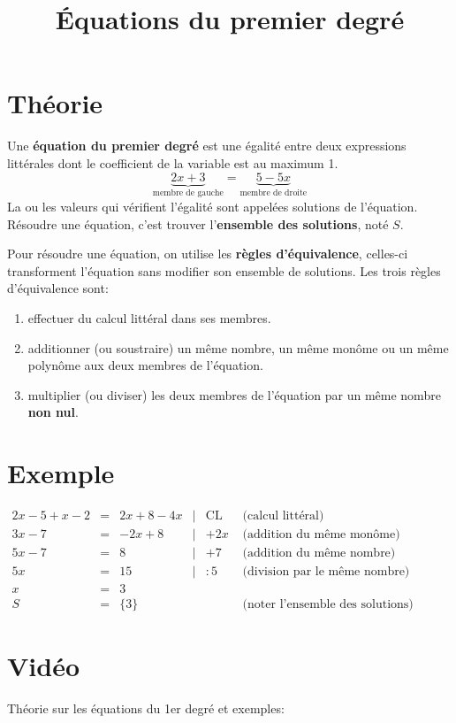 \documentclass[a4paper,11pt]{article}
\begin{document}
\title{Équations du premier degré}
\date{}
\maketitle

\section{Théorie}
Une \textbf{équation du premier degré} est une égalité entre deux expressions littérales dont le coefficient de la variable est au maximum 1.
$$\underbrace{2x + 3}_{\text{membre de gauche}} = \underbrace{5 - 5x}_{\text{membre de droite}}$$
La ou les valeurs qui vérifient l'égalité sont appelées solutions de l'équation. Résoudre une équation, c'est trouver l'\textbf{ensemble des solutions}, noté $S$.

Pour résoudre une équation, on utilise les \textbf{règles d'équivalence}, celles-ci transforment l'équation sans modifier son ensemble de solutions. Les trois règles d'équivalence sont:
\begin{enumerate}[label*=\arabic*.]
\item effectuer du calcul littéral dans ses membres.
\item additionner (ou soustraire) un même nombre, un même monôme ou un même polynôme aux deux membres de l'équation.
\item multiplier (ou diviser) les deux membres de l'équation par un même nombre \textbf{non nul}.
\end{enumerate}

\section{Exemple}
$\begin{array}{rclrll}
2x-5+x-2 &=&2x+8-4x &|& \text{CL} & \text{ (calcul littéral)} \\
3x-7 &=&-2x+8 &|& +2x & \text{ (addition du même monôme)} \\
5x-7 &=& 8 &|& +7 &  \text{ (addition du même nombre)}\\
5x &=& 15 &|& :5 & \text{ (division par le même nombre)}\\
x &=& 3 &&&\\
S &=& \{3\} &&& \text{ (noter l'ensemble des solutions)}
\end{array}$

\section{Vidéo}
Théorie sur les équations du 1er degré et exemples:\par
{}
\end{document}
